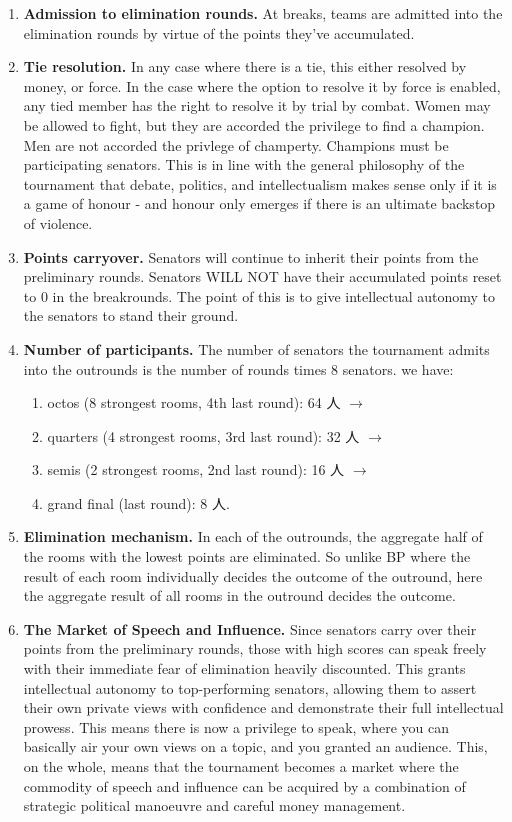 \begin{enumerate}
    \item \textbf{Admission to elimination rounds.} At breaks, teams are admitted into the elimination rounds by virtue of the points they've accumulated. 
    \item \textbf{Tie resolution.} In any case where there is a tie, this either resolved by money, or force. In the case where the option to resolve it by force is enabled, any tied member has the right to resolve it by trial by combat. Women may be allowed to fight, but they are accorded the privilege to find a champion. Men are not accorded the privlege of champerty. Champions must be participating senators. This is in line with the general philosophy of the tournament that debate, politics, and intellectualism makes sense only if it is a game of honour - and honour only emerges if there is an ultimate backstop of violence.
    \item \textbf{Points carryover.} Senators will continue to inherit their points from the preliminary rounds. Senators WILL NOT have their accumulated points reset to 0 in the breakrounds. The point of this is to give intellectual autonomy to the senators to stand their ground. 


    \item \textbf{Number of participants.} The number of senators the tournament admits into the outrounds is the number of rounds times 8 senators. we have: 
        \begin{enumerate}
            \item octos (8 strongest rooms, 4th last round): 64 人 $\rightarrow$
            \item quarters (4 strongest rooms, 3rd last round): 32 人 $\rightarrow$ 
            \item semis (2 strongest rooms, 2nd last round): 16 人 $\rightarrow$ 
            \item grand final (last round): 8 人.
        \end{enumerate}
    
    \item \textbf{Elimination mechanism.} In each of the outrounds, the aggregate half of the rooms with the lowest points are eliminated. So unlike BP where the result of each room individually decides the outcome of the outround, here the aggregate result of all rooms in the outround decides the outcome.
    
    
    \item \textbf{The Market of Speech and Influence.} Since senators carry over their points from the preliminary rounds, those with high scores can speak freely with their immediate fear of elimination heavily discounted. This grants intellectual autonomy to top-performing senators, allowing them to assert their own private views with confidence and demonstrate their full intellectual prowess. This means there is now a privilege to speak, where you can basically air your own views on a topic, and you granted an audience. This, on the whole, means that the tournament becomes a market where the commodity of speech and influence can be acquired by a combination of strategic political manoeuvre and careful money management.
    

\end{enumerate}
